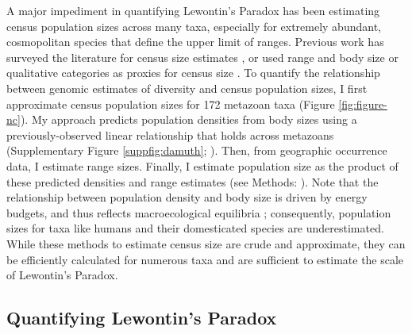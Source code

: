 \documentclass[11pt]{article}
\newcommand{\Newnameref}[1]{\textit{\nameref{#1}}}
\begin{document}
A major impediment in quantifying Lewontin's Paradox has been estimating census
population sizes across many taxa, especially for extremely abundant,
cosmopolitan species that define the upper limit of ranges. Previous work has
surveyed the literature for census size estimates
\parencite{Nei1984-zi,Soule1976-he,Frankham1996-yb}, or used range and body
size or qualitative categories as proxies for census size
\parencite{Corbett-Detig2015-gt,Leffler2012-zj}. To quantify the relationship
between genomic estimates of diversity and census population sizes, I first
approximate census population sizes for 172 metazoan taxa (Figure
\ref{fig:figure-nc}). My approach predicts population densities from body sizes
using a previously-observed linear relationship that holds across metazoans
(Supplementary Figure \ref{suppfig:damuth};
\cite{Damuth1981-st,Damuth1987-sg}). Then, from geographic occurrence data, I
estimate range sizes. Finally, I estimate population size as the product of
these predicted densities and range estimates (see Methods:
\Newnameref{sec:methods-popsize}). Note that the relationship between
population density and body size is driven by energy budgets, and thus reflects
macroecological equilibria \parencite{Damuth1987-sg}; consequently, population
sizes for taxa like humans and their domesticated species are underestimated.
While these methods to estimate census size are crude and approximate, they can
be efficiently calculated for numerous taxa and are sufficient to estimate the
scale of Lewontin's Paradox.

\subsection*{Quantifying Lewontin's Paradox}
\end{document}
